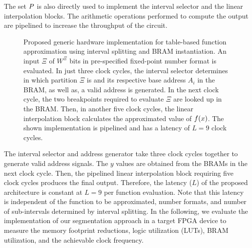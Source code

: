 The set $P$ is also directly used to implement the interval selector and the linear interpolation blocks. 
The arithmetic operations performed to compute the output are pipelined to increase the throughput of the circuit. 
\begin{figure}[t!]
	\centering
	\resizebox{\textwidth}{!}{
		\begin{tikzpicture}
		\archTableBased
		\end{tikzpicture}
	}
	\caption{\label{fig:architecture} Proposed generic hardware implementation for table-based function approximation using interval splitting and BRAM instantiation. 
		An input $\Xi$ of $W^{\Xi}$ bits in pre-specified fixed-point number format is evaluated. 
		In just three clock cycles, the interval selector determines in which partition $\Xi$ is and its respective base address $A_i$ in the BRAM, as well as, a valid address is generated.
		In the next clock cycle, the two breakpoints required to evaluate $\Xi$ are looked up in the \ac{BRAM}. 
		Then, in another five clock cycles, the linear interpolation block calculates the approximated value of $f(x)$.
		The shown implementation is pipelined and has a latency of $L=9$ clock cycles.
	}
\end{figure}
The interval selector and address generator take three clock cycles together to generate valid address signals. 
The $y$ values are obtained from the BRAMs in the next clock cycle. 
Then, the pipelined linear interpolation block requiring five clock cycles produces the final output. 
Therefore, the latency ($L$) of the proposed architecture is constant at $L=9$ per function evaluation. 
Note that this latency is independent of the function to be approximated, number formats, and number of sub-intervals determined by interval splitting. 
In the following, we evaluate the implementation of our segmentation approach in a target \ac{FPGA} device to measure the memory footprint reductions, logic utilization (LUTs), BRAM utilization, and the achievable clock frequency.
